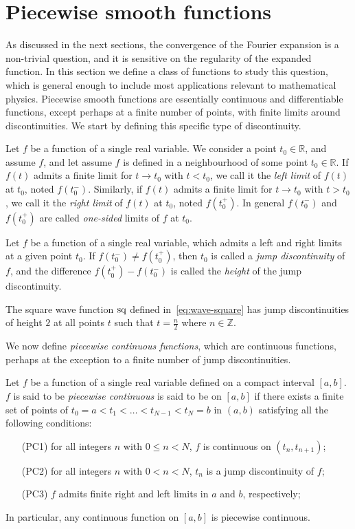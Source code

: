\section{Piecewise smooth functions}
As discussed in the next sections, the convergence of the Fourier expansion is a
non-trivial question, and it is sensitive on the regularity of the expanded function. In
this section we define a class of functions to study this question, which is general
enough to include most applications relevant to mathematical physics. Piecewise smooth
functions are essentially continuous and differentiable functions, except perhaps at a
finite number of points, with finite limits around discontinuities. We start by defining
this specific type of discontinuity.
\begin{definition}
  Let $f$ be a function of a single real variable. We consider a point $t_0\in\mathbb{R}$,
  and assume $f$, and let assume $f$ is defined in a neighbourhood of some point
  $t_0\in\mathbb{R}$. If $f(t)$ admits a finite limit for $t\to t_0$ with $t<t_0$, we call
  it the \emph{left limit} of $f(t)$ at $t_0$, noted $f(t_0^-)$. Similarly, if $f(t)$
  admits a finite limit for $t\to t_0$ with $t>t_0$, we call it the \emph{right limit} of
  $f(t)$ at $t_0$, noted $f(t_0^+)$. In general $f(t_0^-)$ and $f(t_0^+)$ are called
  \emph{one-sided} limits of $f$ at $t_0$.
\end{definition}
\begin{definition}
  Let $f$ be a function of a single real variable, which admits a left and right limits at
  a given point $t_0$. If $f(t_0^-)\neq f(t_0^+)$, then $t_0$ is called a \emph{jump
  discontinuity} of $f$, and the difference $f(t_0^+)-f(t_0^-)$ is called the
  \emph{height} of the jump discontinuity.
\end{definition}
\begin{example}
  The square wave function $\operatorname{sq}$ defined in~\cref{eq:wave-square} has jump discontinuities
  of height $2$ at all points $t$ such that $t=\frac{n}{2}$ where $n\in\mathbb{Z}$.
\end{example}
We now define \emph{piecewise continuous functions}, which are continuous functions,
perhaps at the exception to a finite number of jump discontinuities.
\begin{definition}
  \label{def:pw-cont}
  Let $f$ be a function of a single real variable defined on a compact interval $[a,b]$.
  $f$ is said to be \emph{piecewise continuous} is said to be on $[a,b]$ if there exists a
  finite set of points of $t_0=a<t_1<\dots<t_{N-1}<t_N=b$ in $(a,b)$ satisfying all the
  following conditions:
  \begin{itemize}
    \item[(PC1)] for all integers $n$ with $0\leq n< N$, $f$ is continuous on
      $(t_n,t_{n+1})$;
    \item[(PC2)] for all integers $n$ with $0< n< N$, $t_n$ is a jump discontinuity of
      $f$;
    \item[(PC3)] $f$ admits finite right and left limits in $a$ and $b$, respectively;
  \end{itemize}
  In particular, any continuous function on $[a,b]$ is piecewise continuous.
\end{definition}
